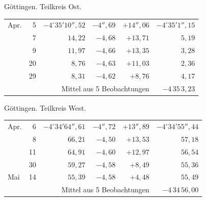 \noindent\begin{minipage}[t]{.495\textwidth}\centering Göttingen. Teilkreis Ost.\par\smallskip
{\scriptsize\setlength{\tabcolsep}{1pt}\renewcommand{\arraystretch}{1.2}\begin{tabular}{lr|r|r|r|r|}
Apr.&5&$-4^\circ35'10''{,}52$&$-4''{,}69$&$+14''{,}06$&$-4^\circ35'1''{,}15$\\
&7&$14{,}22$&$-4{,}68$&$+13{,}71$&$5{,}19$\\
&9&$11{,}97$&$-4{,}66$&$+13{,}35$&$3{,}28$\\
&20&$8{,}76$&$-4{,}63$&$+11{,}03$&$2{,}36$\\
&29&$8{,}31$&$-4{,}62$&$+8{,}76$&$4{,}17$\\
\cline{6-6}\multicolumn{5}{r}{Mittel aus 5 Beobachtungen}&$-4\,35\,3{,}23$
\end{tabular}}\end{minipage}\hfill\begin{minipage}[t]{.495\textwidth}\centering Göttingen. Teilkreis West.\par\smallskip
{\scriptsize\setlength{\tabcolsep}{1pt}\renewcommand{\arraystretch}{1.2}\begin{tabular}{lr|r|r|r|r}
Apr.&6&$-4^\circ34'64''{,}61$&$-4''{,}72$&$+13''{,}89$&$-4^\circ34'55''{,}44$\\
&8&$66{,}21$&$-4{,}50$&$+13{,}53$&$57{,}18$\\
&11&$64{,}91$&$-4{,}60$&$+12{,}97$&$56{,}54$\\
&30&$59{,}27$&$-4{,}58$&$+8{,}49$&$55{,}36$\\
Mai&14&$55{,}39$&$-4{,}58$&$+4{,}48$&$55{,}49$\\
\cline{6-6}\multicolumn{5}{r}{Mittel aus 5 Beobachtungen}&$-4\,34\,56{,}00$
\end{tabular}}\end{minipage}
\par\vspace{4mm}

